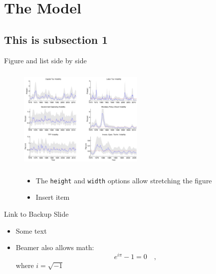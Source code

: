 \documentclass{ctexbeamer}
\begin{document}
\section{The Model}
\subsection{This is subsection 1}

\begin{frame}{Figure and list side by side}
    \begin{figure}[htbp!]
        \begin{minipage}{0.55\linewidth}
            \includegraphics[height=5cm,width=6cm]{smoothedvariances}
        \end{minipage}
        \begin{minipage}{0.4\linewidth}
            \begin{itemize}
            \item The \texttt{height} and \texttt{width} options allow stretching the figure
            \item Insert item
            \end{itemize}
        \end{minipage}
    \end{figure}
\end{frame}


\begin{frame}{Link to Backup Slide}\label{modelstructure} %
        \begin{itemize}
            \item Some text
            \item Beamer also allows math:
            \begin{equation}
                e^{i\pi}-1=0 \quad ,
            \end{equation}
            where $i=\sqrt{-1}$
        \end{itemize}
\hyperlink{model_appendix}{} %
\end{frame}
\end{document}

